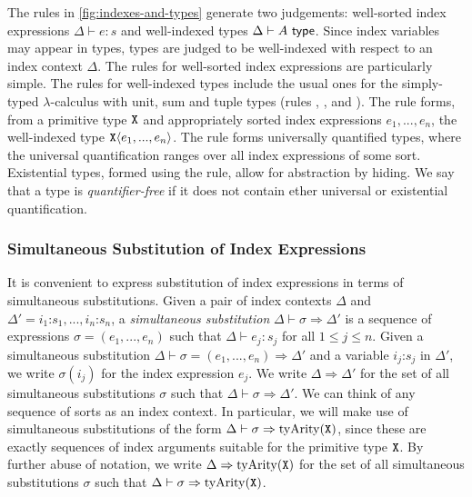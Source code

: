 The rules in \autoref{fig:indexes-and-types}
generate two judgements: well-sorted index expressions $\Delta \vdash
e : s$ and well-indexed types $\Delta \vdash A \textup{\textsf{ type}}$. Since index
variables may appear in types, types are judged to be well-indexed
with respect to an index context $\Delta$. The rules for well-sorted
index expressions are particularly simple. %
The rules for well-indexed types include the usual ones
for
the simply-typed $\lambda$-calculus with unit, sum and tuple types
(rules , ,  and
). The rule  %
forms, from a primitive type $\textup{\texttt{X}}$ and appropriately sorted
index expressions $e_1,...,e_n$, the well-indexed type
$\textup{\texttt{X}}\langle e_1,...,e_n \rangle$. The rule  
forms universally quantified types, where the universal
quantification ranges over all index expressions of some
sort. Existential types, %
formed using the  rule,
allow for abstraction by hiding. %
We say that a type is \emph{quantifier-free} if it does not contain
ether universal or existential quantification.

\subsubsection{Simultaneous Substitution of Index Expressions}
\label{sec:simultaneous-substitution}

It %
is convenient to express substitution of index
expressions %
in terms of simultaneous substitutions.
Given a pair of index contexts $\Delta$ and $\Delta' = i_1 \mathord:
s_1, ..., i_n \mathord: s_n$, a \emph{simultaneous substitution}
$\Delta \vdash \sigma \Rightarrow \Delta'$ is a sequence of
expressions $\sigma = (e_1,...,e_n)$ such that $\Delta \vdash e_j :
s_j$ for all $1 \leq j \leq n$. Given a simultaneous substitution
$\Delta \vdash \sigma = (e_1,...,e_n) \Rightarrow \Delta'$ and a
variable $i_j \mathord: s_j$ in $\Delta'$, we write $\sigma(i_j)$ for
the index expression $e_j$. We write $\Delta \Rightarrow \Delta'$ for
the set of all simultaneous substitutions $\sigma$ such that $\Delta
\vdash \sigma \Rightarrow \Delta'$.
%
We can think of any sequence of sorts as an index
context. In particular, we will make use of simultaneous substitutions
of the form $\Delta \vdash \sigma \Rightarrow
\mathrm{tyArity}(\textup{\texttt{X}})$, since these are exactly sequences of
index arguments suitable for the primitive type $\textup{\texttt{X}}$. By
further abuse of notation, we write $\Delta \Rightarrow
\mathrm{tyArity}(\textup{\texttt{X}})$ for the set of all simultaneous
substitutions $\sigma$ such that $\Delta \vdash \sigma \Rightarrow
\mathrm{tyArity}(\textup{\texttt{X}})$.

